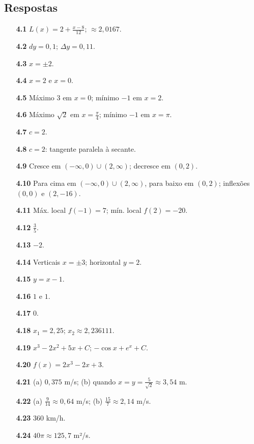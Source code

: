 \subsection*{Respostas}
{\small\begin{multicols}{2}\raggedright
\begin{itemize}[leftmargin=2.7em,labelsep=0.5em,itemsep=1pt]
\item[\textbf{4.1}] $L(x)=2+\tfrac{x-8}{12}$; $\approx2{,}0167$.
\item[\textbf{4.2}] $dy=0{,}1$; $\Delta y=0{,}11$.
\item[\textbf{4.3}] $x=\pm2$.
\item[\textbf{4.4}] $x=2$ e $x=0$.
\item[\textbf{4.5}] Máximo $3$ em $x=0$; mínimo $-1$ em $x=2$.
\item[\textbf{4.6}] Máximo $\sqrt2$ em $x=\tfrac\pi4$; mínimo $-1$ em $x=\pi$.
\item[\textbf{4.7}] $c=2$.
\item[\textbf{4.8}] $c=2$: tangente paralela à secante.
\item[\textbf{4.9}] Cresce em $(-\infty,0)\cup(2,\infty)$; decresce em $(0,2)$.
\item[\textbf{4.10}] Para cima em $(-\infty,0)\cup(2,\infty)$, para baixo em $(0,2)$; inflexões $(0,0)$ e $(2,-16)$.
\item[\textbf{4.11}] Máx. local $f(-1)=7$; mín. local $f(2)=-20$.
\item[\textbf{4.12}] $\tfrac35$.
\item[\textbf{4.13}] $-2$.
\item[\textbf{4.14}] Verticais $x=\pm3$; horizontal $y=2$.
\item[\textbf{4.15}] $y=x-1$.
\item[\textbf{4.16}] $1$ e $1$.
\item[\textbf{4.17}] $0$.
\item[\textbf{4.18}] $x_1=2{,}25$; $x_2\approx2{,}236111$.
\item[\textbf{4.19}] $x^3-2x^2+5x+C$; $-\cos x+e^x+C$.
\item[\textbf{4.20}] $f(x)=2x^3-2x+3$.
\item[\textbf{4.21}] (a) $0{,}375$ m/s; (b) quando $x=y=\tfrac{5}{\sqrt2}\approx3{,}54$ m.
\item[\textbf{4.22}] (a) $\tfrac{9}{14}\approx0{,}64$ m/s; (b) $\tfrac{15}{7}\approx2{,}14$ m/s.
\item[\textbf{4.23}] 360 km/h.
\item[\textbf{4.24}] $40\pi\approx125{,}7$ m²/s.

\end{itemize}
\end{multicols}}
